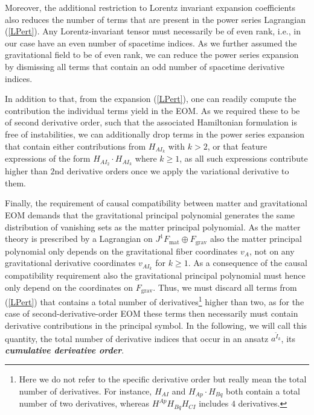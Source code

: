Moreover, the additional restriction to Lorentz invariant expansion coefficients also reduces the number of terms that are present in the power series Lagrangian (\ref{LPert}). Any Lorentz-invariant tensor must necessarily be of even rank, i.e., in our case have an even number of spacetime indices. As we further assumed the gravitational field to be of even rank, we can reduce the power series expansion by dismissing all terms that contain an odd number of spacetime derivative indices.

In addition to that, from the expansion (\ref{LPert}), one can readily compute the contribution the individual terms yield in the EOM.  As we required these to be of second derivative order, such that the associated Hamiltonian formulation is free of instabilities, we can additionally drop terms in the power series expansion that contain either contributions from $H_{AI_k}$ with $k>2$, or that feature expressions of the form $H_{AI_2}\cdot H_{AI_k}$ where $k\geq 1$, as all such expressions contribute higher than $2$nd derivative orders once we apply the variational derivative to them.

Finally, the requirement of causal compatibility between matter and gravitational EOM demands that the gravitational principal polynomial generates the same distribution of vanishing sets as the matter principal polynomial. As the matter theory is prescribed by a Lagrangian on $J^1F_{\text{mat}} \oplus F_{\text{grav}}$ also the matter principal polynomial only depends on the gravitational fiber coordinates $v_A$, not on any gravitational derivative coordinates $v_{AI_k}$ for $k\geq 1$.
As a consequence of the causal compatibility requirement also the gravitational principal polynomial must hence only depend on the coordinates on $F_{\text{grav}}$. Thus, we must discard all terms from (\ref{LPert}) that contains a total number of derivatives\footnote{Here we do not refer to the specific derivative order but really mean the total number of derivatives. For instance, $H_{AI}$ and $H_{Ap} \cdot H_{Bq}$ both contain a total number of two derivatives, whereas $H^{Ap}H_{Bq}H_{CI}$ includes $4$ derivatives.} higher than two, as for the case of second-derivative-order EOM these terms then necessarily must contain derivative contributions in the principal symbol.
In the following, we will call this quantity, the total number of derivative indices that occur in an ansatz $a^{\tilde{I}_k}$, its \textit{\textbf{cumulative derivative order}}.  

